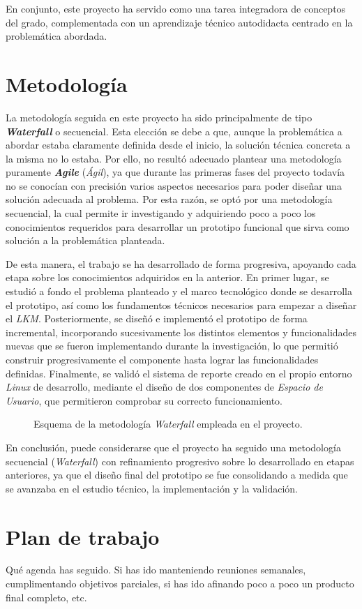En conjunto, este proyecto ha servido como una tarea integradora de conceptos del grado, complementada con un aprendizaje técnico autodidacta centrado en la problemática abordada.
 
\section{Metodología}

La metodología seguida en este proyecto ha sido principalmente de tipo \textbf{\textit{Waterfall}} o secuencial.
Esta elección se debe a que, aunque la problemática a abordar estaba claramente definida desde el inicio, la solución técnica concreta a la misma no lo estaba.
Por ello, no resultó adecuado plantear una metodología puramente \textbf{\textit{Agile}} (\textit{Ágil}), ya que durante las primeras fases del proyecto todavía no se conocían con precisión varios aspectos necesarios para poder diseñar una solución adecuada al problema.
Por esta razón, se optó por una metodología secuencial, la cual permite ir investigando y adquiriendo poco a poco los conocimientos requeridos para desarrollar un prototipo funcional que sirva como solución a la problemática planteada.

De esta manera, el trabajo se ha desarrollado de forma progresiva, apoyando cada etapa sobre los conocimientos adquiridos en la anterior.
En primer lugar, se estudió a fondo el problema planteado y el marco tecnológico donde se desarrolla el prototipo, así como los fundamentos técnicos necesarios para empezar a diseñar el \textit{LKM}.
Posteriormente, se diseñó e implementó el prototipo de forma incremental, incorporando sucesivamente los distintos elementos y funcionalidades nuevas que se fueron implementando durante la investigación, lo que permitió construir progresivamente el componente hasta lograr las funcionalidades definidas.
Finalmente, se validó el sistema de reporte creado en el propio entorno \textit{Linux} de desarrollo, mediante el diseño de dos componentes de \textit{Espacio de Usuario}, que permitieron comprobar su correcto funcionamiento.\\

\begin{figure}[h!]
  \centering
  \scalebox{0.9}{}
  \caption{Esquema de la metodología \textit{Waterfall} empleada en el proyecto.}
  \label{fig:methodology_progression}
\end{figure}

En conclusión, puede considerarse que el proyecto ha seguido una metodología secuencial (\textit{Waterfall}) con refinamiento progresivo sobre lo desarrollado en etapas anteriores, ya que el diseño final del prototipo se fue consolidando a medida que se avanzaba en el estudio técnico, la implementación y la validación.

\section{Plan de trabajo}

Qué agenda has seguido. Si has ido manteniendo reuniones semanales, cumplimentando objetivos parciales, si has ido afinando poco a poco un producto final completo, etc.
